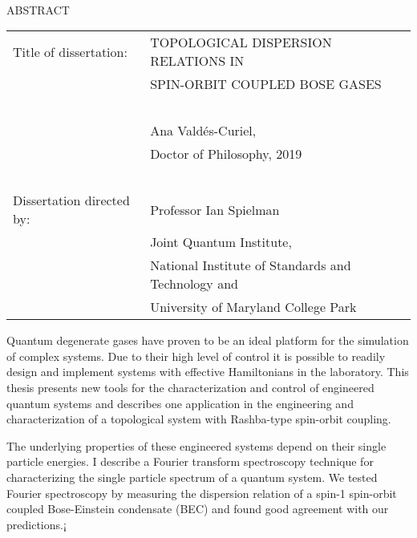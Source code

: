 
\hbox{\ }

\renewcommand{\baselinestretch}{1}
\small \normalsize

\begin{center}
\large{{ABSTRACT}} 

\vspace{3em} 

\end{center}
\hspace{-.15in}
\begin{tabular}{ll}
Title of dissertation:   
&				      {\large  TOPOLOGICAL DISPERSION RELATIONS IN } \\
&				      {\large  SPIN-ORBIT COUPLED BOSE GASES} \\
\ \\
&                     {\large  Ana Valdés-Curiel,} \\
&					  {\large  Doctor of Philosophy, 2019} \\
\ \\
Dissertation directed by: & {\large  Professor Ian Spielman} \\
&  							{\small	 Joint Quantum Institute,} \\
&  							{\small	 National Institute of Standards and Technology and} \\
&  							{\small	 University of Maryland College Park} \\
\end{tabular}

\vspace{3em}

\renewcommand{\baselinestretch}{2}
\large \normalsize

Quantum degenerate gases have proven to be an ideal platform for the  simulation of complex systems. Due to their high level of control it is possible to readily design and implement systems with effective Hamiltonians in the laboratory. This thesis presents new tools for the characterization and control of engineered quantum systems and describes one application in the engineering and characterization of a topological system with Rashba-type spin-orbit coupling. 

The underlying properties of these engineered systems depend on their single particle energies. I describe a Fourier transform spectroscopy technique for characterizing the single particle spectrum of a quantum system. We tested Fourier spectroscopy by measuring the dispersion relation of a spin-1 spin-orbit coupled Bose-Einstein condensate (BEC) and found good agreement with our predictions.¡

